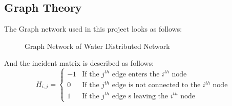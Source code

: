 \subsection{Graph Theory}
The Graph network used in this project looks as follows:

\begin{figure}[h!]
	\centering
		\resizebox{\columnwidth}{!}{
	}
	\caption{Graph Network of Water Distributed Network}
\end{figure}

And the incident matrix is described as follows:
\begin{equation*}
	H_{i,j} = \begin{cases}
		-1 & \text{If the $j^{th}$ edge enters the $i^{th}$ node} \\
		0 & \text{If the $j^{th}$ edge is not connected to the $i^{th}$ node} \\
		1 & \text{If the $j^{th}$ edge s leaving the $i^{th}$ node}
	\end{cases}
\end{equation*} %